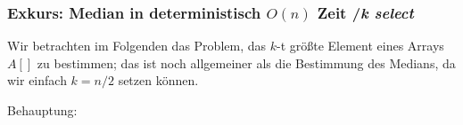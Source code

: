 \documentclass{article}
\begin{document}
\subsubsection{Exkurs: Median in deterministisch $O(n)$ Zeit /\textit{k select}}
Wir betrachten im Folgenden das Problem, das $k$-t größte Element eines Arrays $A[]$ zu bestimmen; das ist noch allgemeiner als die Bestimmung des Medians, da wir einfach $k=n/2$ setzen können.
\begin{algorithm}
\end{algorithm}
Behauptung: 
\end{document}
